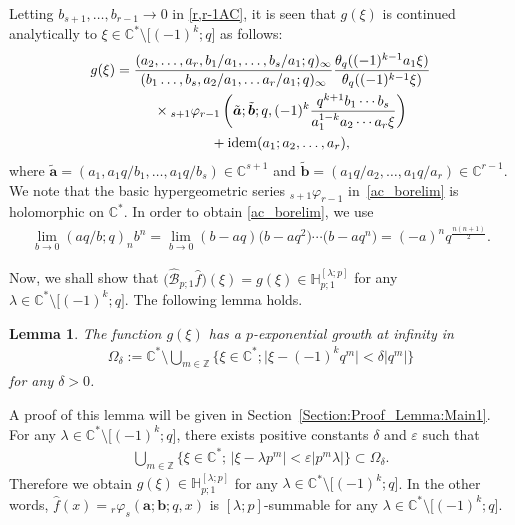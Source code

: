 \documentclass[pdftex]{sigma}
\numberwithin{equation}{section}
\newtheorem{Lemma}[Theorem]{Lemma}
\newcommand{\idem}{{\rm idem}}
\begin{document}
Letting $b_{s+1},\ldots,b_{r-1}\to 0$ in \eqref{r,r-1AC}, it is seen that $g(\xi)$ is continued analytically to $\xi\in\mathbb{C}^*\setminus\big[(-1)^{k};q\big]$ as follows:
\begin{gather}
g(\xi)=\frac{(a_2,\ldots,a_r,b_1/a_1,\ldots,b_{s}/a_1;q)_\infty}{(b_1\ldots,b_s,a_2/a_1,\ldots a_r/a_1;q)_\infty}\frac{\theta_q((-1)^{k-1}a_1\xi)}{\theta_q((-1)^{k-1}\xi)}\nonumber\\
\hphantom{g(\xi)=}{} \times{}_{s+1}\varphi_{r-1}\left(\tilde{\bm{a}};\tilde{\bm{b}};q,(-1)^k\frac{q^{k+1}b_1\cdots b_s}{a_1^{1-k}a_2\cdots a_r\xi}\right)\nonumber\\
\hphantom{g(\xi)=}{} +\idem(a_1;a_2,\ldots,a_r),\label{ac_borelim}
\end{gather}
where $\tilde{\bm{a}}=(a_1,a_1q/b_1,\ldots,a_1q/b_s)\in\mathbb{C}^{s+1}$ and $\tilde{\bm{b}}=(a_1q/a_2,\ldots,a_1q/a_r)\in\mathbb{C}^{r-1}$. We note that the basic hypergeometric series ${}_{s+1}\varphi_{r-1}$ in~\eqref{ac_borelim} is holomorphic on $\mathbb{C}^*$. In order to obtain \eqref{ac_borelim}, we use
\begin{gather*}
\lim_{b\to0}(aq/b;q)_nb^n=\lim_{b\to0}(b-aq)\big(b-aq^2\big)\cdots\big(b-aq^n\big)=(-a)^nq^{\frac{n(n+1)}{2}}.
\end{gather*}

Now, we shall show that $\big(\hat{\mathcal{B}}_{p;1}\hat{f}\big)(\xi)=g(\xi)\in\mathbb{H}_{p;1}^{[\lambda;p]}$ for any $\lambda\in\mathbb{C}^*\setminus\big[(-1)^k;q\big]$. The following lemma holds.
\begin{Lemma}\label{Lemma:Main1}
The function $g(\xi)$ has a $p$-exponential growth at infinity in
\begin{gather*}
\Omega_\delta:=\mathbb{C}^*\setminus\bigcup_{m\in\mathbb{Z}}\big\{\xi\in\mathbb{C}^* ;\big\vert\xi-(-1)^{k}q^m\vert<\delta\big\vert q^m\vert\big\}
\end{gather*}
for any $\delta>0$.
\end{Lemma}
A proof of this lemma will be given in Section~\ref{Section:Proof_Lemma:Main1}. For any $\lambda\in\mathbb{C}^*\setminus\big[(-1)^k;q\big]$, there exists positive constants $\delta$ and $\varepsilon$ such that
\begin{gather*}
\bigcup_{m\in\mathbb{Z}}\big\{\xi\in\mathbb{C}^* ;\,\vert\xi-\lambda p^m\vert<\varepsilon\vert p^m\lambda\vert\big\}\subset\Omega_\delta.
\end{gather*}
Therefore we obtain $g(\xi)\in\mathbb{H}_{p;1}^{[\lambda;p]}$ for any $\lambda\in\mathbb{C}^*\setminus\big[(-1)^k;q\big]$. In the other words, $\hat{f}(x)={}_r\varphi_s(\bm{a};\bm{b};q,x)$ is $[\lambda;p]$-summable for any $\lambda\in\mathbb{C}^*\setminus\big[(-1)^k;q\big]$.
\end{document}
